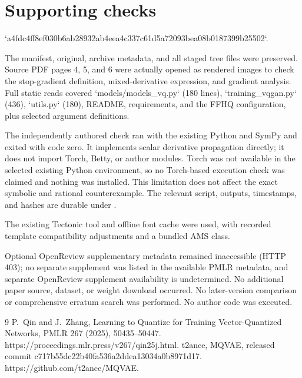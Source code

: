\documentclass[10pt]{article}
\begin{document}
\section*{Supporting checks}
`a4fdc4ff8ef030b6ab28932ab4eea4c337c61d5a72093bea08b0187399b25502`.\par
The manifest, original, archive metadata, and all staged tree files were preserved. Source PDF pages 4, 5, and 6 were actually opened as rendered images to check the stop-gradient definition, mixed-derivative expression, and gradient analysis. Full static reads covered `models/models\_vq.py` (180 lines), `training\_vqgan.py` (436), `utils.py` (180), README, requirements, and the FFHQ configuration, plus selected argument definitions.\par
The independently authored check ran with the existing Python and SymPy and exited with code zero. It implements scalar derivative propagation directly; it does not import Torch, Betty, or author modules. Torch was not available in the selected existing Python environment, so no Torch-based execution check was claimed and nothing was installed. This limitation does not affect the exact symbolic and rational counterexample. The relevant script, outputs, timestamps, and hashes are durable under .\par
The existing Tectonic tool and offline font cache were used, with recorded template compatibility adjustments and a bundled AMS class.\par
Optional OpenReview supplementary metadata remained inaccessible (HTTP 403); no separate supplement was listed in the available PMLR metadata, and separate OpenReview supplement availability is undetermined. No additional paper source, dataset, or weight download occurred. No later-version comparison or comprehensive erratum search was performed. No author code was executed.\par
9 P. Qin and J. Zhang, Learning to Quantize for Training Vector-Quantized Networks, PMLR 267 (2025), 50435–50447. https://proceedings.mlr.press/v267/qin25j.html. t2ance, MQVAE, released commit c717b55dc22b40fa536a2ddea13034a0b8971d17. https://github.com/t2ance/MQVAE.\par
\end{document}
